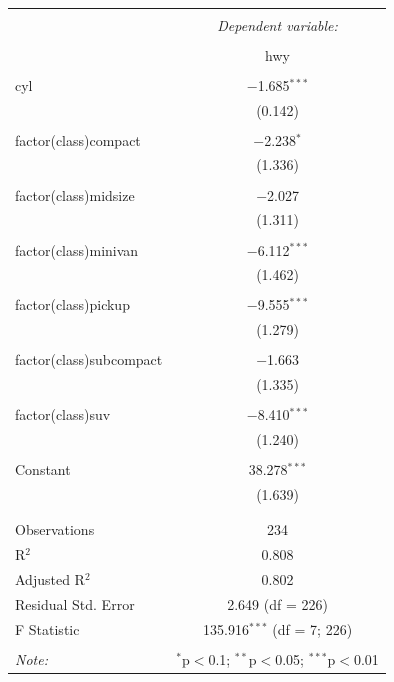 \documentclass[12pt,]{article}
\begin{document}
\begin{table}[!htbp] \centering 
  \caption{} 
  \label{} 
\begin{tabular}{@{\extracolsep{5pt}}lc} 
\\[-1.8ex]\hline 
\hline \\[-1.8ex] 
 & \multicolumn{1}{c}{\textit{Dependent variable:}} \\ 
\cline{2-2} 
\\[-1.8ex] & hwy \\ 
\hline \\[-1.8ex] 
 cyl & $-$1.685$^{***}$ \\ 
  & (0.142) \\ 
  & \\ 
 factor(class)compact & $-$2.238$^{*}$ \\ 
  & (1.336) \\ 
  & \\ 
 factor(class)midsize & $-$2.027 \\ 
  & (1.311) \\ 
  & \\ 
 factor(class)minivan & $-$6.112$^{***}$ \\ 
  & (1.462) \\ 
  & \\ 
 factor(class)pickup & $-$9.555$^{***}$ \\ 
  & (1.279) \\ 
  & \\ 
 factor(class)subcompact & $-$1.663 \\ 
  & (1.335) \\ 
  & \\ 
 factor(class)suv & $-$8.410$^{***}$ \\ 
  & (1.240) \\ 
  & \\ 
 Constant & 38.278$^{***}$ \\ 
  & (1.639) \\ 
  & \\ 
\hline \\[-1.8ex] 
Observations & 234 \\ 
R$^{2}$ & 0.808 \\ 
Adjusted R$^{2}$ & 0.802 \\ 
Residual Std. Error & 2.649 (df = 226) \\ 
F Statistic & 135.916$^{***}$ (df = 7; 226) \\ 
\hline 
\hline \\[-1.8ex] 
\textit{Note:}  & \multicolumn{1}{r}{$^{*}$p$<$0.1; $^{**}$p$<$0.05; $^{***}$p$<$0.01} \\ 
\end{tabular} 
\end{table}
\end{document}
